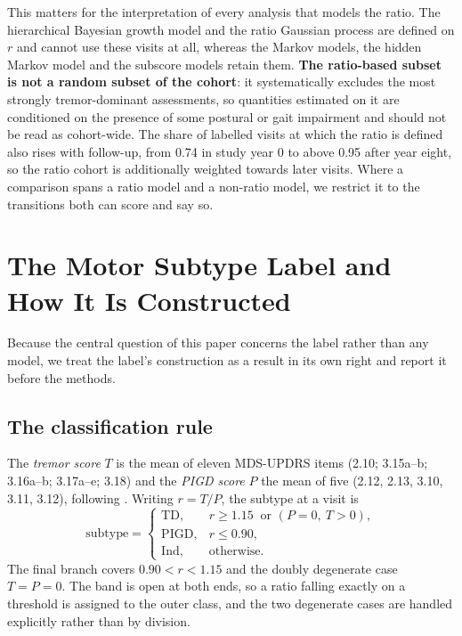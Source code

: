 \documentclass[11pt]{article}
\newcommand{\TD}{\mathrm{TD}}
\newcommand{\PIGD}{\mathrm{PIGD}}
\newcommand{\Ind}{\mathrm{Ind}}
\begin{document}
This matters for the interpretation of every analysis that models the ratio. The
hierarchical Bayesian growth model and the ratio Gaussian process are defined on
$r$ and cannot use these visits at all, whereas the Markov models, the hidden
Markov model and the subscore models retain them. \textbf{The ratio-based subset
is not a random subset of the cohort}: it systematically excludes the most
strongly tremor-dominant assessments, so quantities estimated on it are
conditioned on the presence of some postural or gait impairment and should not be
read as cohort-wide. The share of labelled visits at which the ratio is defined
also rises with follow-up, from 0.74 in study year 0 to above 0.95 after year
eight, so the ratio cohort is additionally weighted towards later visits. Where a
comparison spans a ratio model and a non-ratio model, we restrict it to the
transitions both can score and say so.

\section{The Motor Subtype Label and How It Is Constructed}
\label{sec:construction}

Because the central question of this paper concerns the label rather than any
model, we treat the label's construction as a result in its own right and report
it before the methods.

\subsection{The classification rule}
\label{sec:rule}
The \emph{tremor score} $T$ is the mean of eleven MDS-UPDRS items (2.10;
3.15a--b; 3.16a--b; 3.17a--e; 3.18) and the \emph{PIGD score} $P$ the mean of five
(2.12, 2.13, 3.10, 3.11, 3.12), following \citet{stebbins2013}. Writing
$r = T/P$, the subtype at a visit is
\begin{equation}
\mathrm{subtype} =
\begin{cases}
\TD,   & r \geq 1.15 \ \text{ or } (P = 0,\ T > 0),\\[2pt]
\PIGD, & r \leq 0.90,\\[2pt]
\Ind,  & \text{otherwise.}
\end{cases}
\label{eq:rule}
\end{equation}
The final branch covers $0.90 < r < 1.15$ and the doubly degenerate case
$T = P = 0$. The band is open at both ends, so a ratio falling exactly on a
threshold is assigned to the outer class, and the two degenerate cases are
handled explicitly rather than by division.
\end{document}
